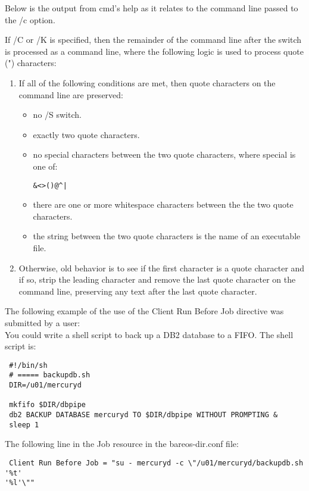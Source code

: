 \begin{description}
Below is the output from cmd's help as it relates to the command line
passed to the /c option.

If /C or /K is specified, then the remainder of the command line after
the switch is processed as a command line, where the following logic is
used to process quote (") characters:

\begin{enumerate}
\item
If all of the following conditions are met, then quote characters
on the command line are preserved:
\begin{itemize}
\item no /S switch.
\item exactly two quote characters.
\item no special characters between the two quote characters,
where special is one of:
\begin{verbatim}
&<>()@^|
\end{verbatim}
\item there are one or more whitespace characters between the
the two quote characters.
\item the string between the two quote characters is the name
of an executable file.
\end{itemize}

\item  Otherwise, old behavior is to see if the first character is
a quote character and if so, strip the leading character and
remove the last quote character on the command line, preserving
any text after the last quote character.
\end{enumerate}

The following example of the use of the Client Run Before Job directive was
submitted by a user:\\
You could write a shell script to back up a DB2 database to a FIFO. The shell
script is:

\footnotesize
\begin{verbatim}
 #!/bin/sh
 # ===== backupdb.sh
 DIR=/u01/mercuryd

 mkfifo $DIR/dbpipe
 db2 BACKUP DATABASE mercuryd TO $DIR/dbpipe WITHOUT PROMPTING &
 sleep 1
\end{verbatim}
\normalsize

The following line in the Job resource in the bareos-dir.conf file:
\footnotesize
\begin{verbatim}
 Client Run Before Job = "su - mercuryd -c \"/u01/mercuryd/backupdb.sh '%t'
'%l'\""
\end{verbatim}
\normalsize


\end{description}
